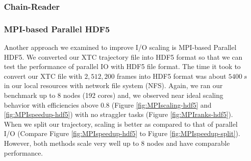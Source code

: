 \subsubsection{Chain-Reader}

\subsubsection{MPI-based Parallel HDF5}
\label{HDF5}
Another approach we examined to improve I/O scaling is MPI-based Parallel HDF5. 
We converted our XTC trajectory file into HDF5 format so that we can test the performance of parallel IO with HDF5 file format.
The time it took to convert our XTC file with $2,512,200$ frames into HDF5 format was about $5400~s$ in our local resources with network file system (NFS).
Again, we ran our benchmark up to 8 nodes (192 cores) and, we observed near ideal scaling behavior with efficiencies above 0.8 (Figure \ref{fig:MPIscaling-hdf5} and \ref{fig:MPIspeedup-hdf5}) with no straggler tasks (Figure \ref{fig:MPIranks-hdf5}).  
When we split our trajectory, scaling is better as compared to that of parallel I/O (Compare Figure \ref{fig:MPIspeedup-hdf5} to Figure \ref{fig:MPIspeedup-split}). 
However, both methods scale very well up to 8 nodes and have comparable performance.  

